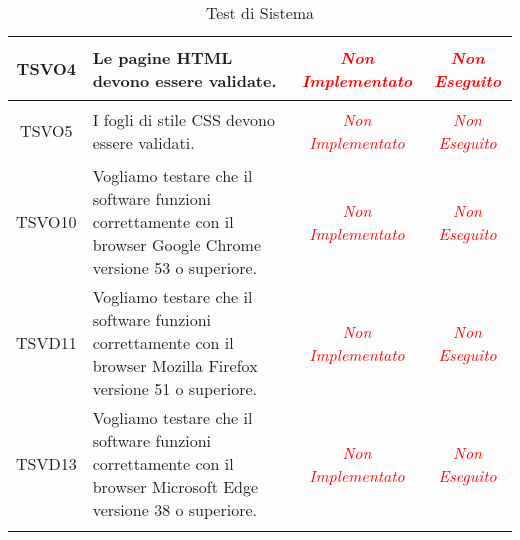 \begin{longtable}{|c|>{}m{8cm}|c|c|}
\hypertarget{TSVO4}{TSVO4} & Le pagine HTML devono essere validate. & \textcolor{red}{\textit{Non Implementato}} & \textcolor{red}{\textit{Non Eseguito}}\\ \hline
\hypertarget{TSVO5}{TSVO5} & I fogli di stile CSS devono essere validati. & \textcolor{red}{\textit{Non Implementato}} & \textcolor{red}{\textit{Non Eseguito}}\\ \hline
\hypertarget{TSVO10}{TSVO10} & Vogliamo testare che il software funzioni correttamente con il browser Google Chrome versione 53 o superiore. & \textcolor{red}{\textit{Non Implementato}} & \textcolor{red}{\textit{Non Eseguito}}\\ \hline
\hypertarget{TSVD11}{TSVD11} & Vogliamo testare che il software funzioni correttamente con il browser Mozilla Firefox versione 51 o superiore. & \textcolor{red}{\textit{Non Implementato}} & \textcolor{red}{\textit{Non Eseguito}}\\ \hline
\hypertarget{TSVD13}{TSVD13} & Vogliamo testare che il software funzioni correttamente con il browser Microsoft Edge versione 38 o superiore. & \textcolor{red}{\textit{Non Implementato}} & \textcolor{red}{\textit{Non Eseguito}}\\ \hline
\caption[Test di Sistema]{Test di Sistema}
\label{tabella:test1}
\end{longtable}
\clearpage

